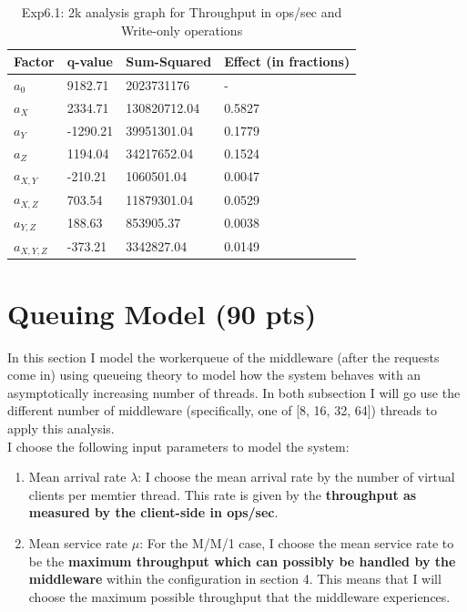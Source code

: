 \documentclass[11pt,a4paper]{article}
\begin{document}
		
							

\begin{center}
	\begin{table}[H]
	\center
    \begin{tabular}{ | l | l | l | l |  }
    \hline
    Factor & q-value & Sum-Squared & Effect (in fractions) \\ \hline
    $a_0$ & 9182.71& 2023731176 & - \\ \hline
    $a_X$ & 2334.71 & 130820712.04 & 0.5827	 \\ \hline
    $a_Y$ & -1290.21 & 39951301.04 & 0.1779 \\ \hline
    $a_Z$ & 1194.04  & 34217652.04	 & 0.1524 \\ \hline
   	$a_{X, Y}$ & -210.21	 & 1060501.04	 & 0.0047 \\ \hline
    $a_{X, Z}$ & 703.54	 & 11879301.04 & 0.0529 \\ \hline
    $a_{Y, Z}$ & 188.63	 & 853905.37 & 0.0038 \\ \hline
    $a_{X, Y, Z}$ & -373.21 & 3342827.04 & 0.0149 \\
    \hline
    \end{tabular}
  	\caption{Exp6.1: 2k analysis graph for Throughput in ops/sec and Write-only operations}	 
  	\end{table}  
\end{center}

\section{Queuing Model (90 pts)}

In this section I model the workerqueue of the middleware (after the requests come in) using queueing theory to model how the system behaves with an asymptotically increasing number of threads.
In both subsection I will go use the different number of middleware (specifically, one of [8, 16, 32, 64]) threads to apply this analysis. \\

I choose the following input parameters to model the system:

\begin{enumerate}
\item Mean arrival rate $\lambda$: I choose the mean arrival rate by the number of virtual clients per memtier thread.
This rate is given by the \textbf{throughput as measured by the client-side in ops/sec}.
\item Mean service rate $\mu$: For the M/M/1 case, I choose the mean service rate to be the \textbf{maximum throughput which can possibly be handled by the middleware} within the configuration in section 4.
This means that I will choose the maximum possible throughput that the middleware experiences.
\end{enumerate}
\end{document}
